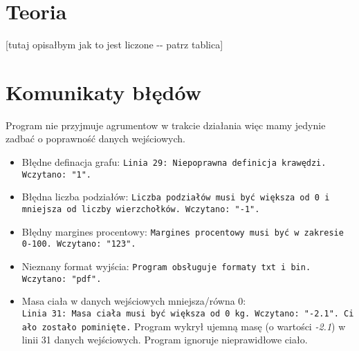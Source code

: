 \documentclass[]{article}
\begin{document}
\section{Teoria}\label{header-n279}

{[}tutaj opisałbym jak to jest liczone -\/- patrz tablica{]}

\section{Komunikaty błędów}\label{header-n281}

Program nie przyjmuje agrumentow w trakcie działania więc mamy jedynie zadbać o poprawność danych wejściowych.

\begin{itemize}
\item
    Błędne definacja grafu: \texttt{Linia 29: Niepoprawna definicja krawędzi. Wczytano: "1".}
\item
    Błędna liczba podziałów: \texttt{Liczba podziałów musi być większa od 0 i mniejsza od liczby wierzchołków. Wczytano: "-1".}
\item
    Błędny margines procentowy: \texttt{Margines procentowy musi być w zakresie 0-100. Wczytano: "123".}
\item
    Nieznany format wyjścia: \texttt{Program obsługuje formaty txt i bin. Wczytano: "pdf".}
\item
  Masa ciała w danych wejściowych mniejsza/równa 0:
  \texttt{Linia\ 31:\ Masa\ ciała\ musi\ być\ większa\ od\ 0\ kg.\ Wczytano:\ "-2.1".\ Ciało\ zostało\ pominięte.}
  Program wykrył ujemną masę (o wartości \emph{-2.1}) w linii 31 danych
  wejściowych. Program ignoruje nieprawidłowe ciało.
\end{itemize}
\end{document}
